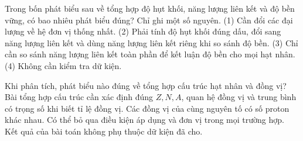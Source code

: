 \begin{ex}
Trong bốn phát biểu sau về tổng hợp độ hụt khối, năng lượng liên kết và độ bền vững, có bao nhiêu phát biểu đúng? Chỉ ghi một số nguyên. (1) Cần đổi các đại lượng về hệ đơn vị thống nhất. (2) Phải tính độ hụt khối đúng dấu, đổi sang năng lượng liên kết và dùng năng lượng liên kết riêng khi so sánh độ bền. (3) Chỉ cần so sánh năng lượng liên kết toàn phần để kết luận độ bền cho mọi hạt nhân. (4) Không cần kiểm tra dữ kiện.
\end{ex}

\begin{ex}
Khi phân tích, phát biểu nào đúng về tổng hợp cấu trúc hạt nhân và đồng vị?
\choice
{\True Bài tổng hợp cấu trúc cần xác định đúng $Z,N,A$, quan hệ đồng vị và trung bình có trọng số khi biết tỉ lệ đồng vị.}
{Các đồng vị của cùng nguyên tố có số proton khác nhau.}
{Có thể bỏ qua điều kiện áp dụng và đơn vị trong mọi trường hợp.}
{Kết quả của bài toán không phụ thuộc dữ kiện đã cho.}
\end{ex}

